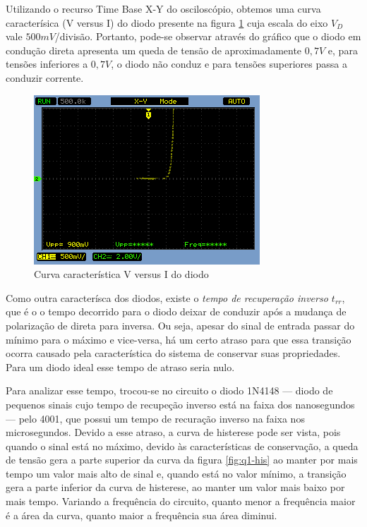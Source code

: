 \documentclass[a4paper]{article} %
\begin{document}
Utilizando o recurso Time Base X-Y do osciloscópio, obtemos uma curva caracterísica (V versus I) do diodo presente na figura \ref{fig:q1-curva2} cuja escala do eixo $V_D$ vale $500mV$/divisão. Portanto, pode-se observar através do gráfico que o diodo em condução direta apresenta um queda de tensão de aproximadamente $0,7V$ e, para tensões inferiores a $0,7V$, o diodo não conduz e para tensões superiores passa a conduzir corrente.    
\begin{figure}[h]
\begin{centering}
\includegraphics[scale=0.5]{Imagens/3.1/NewFile0} \caption{Curva característica V versus I do diodo  \label{fig:q1-curva2}}
\par\end{centering}
\end{figure}


Como outra caracterísca dos diodos, existe o \textit{tempo de recuperação inverso $t_{rr}$}, que é o o tempo decorrido para o diodo deixar de conduzir após a mudança de polarização de direta para inversa. Ou seja, apesar do sinal de entrada passar do mínimo para o máximo e vice-versa, há um certo atraso para que essa transição ocorra causado pela característica do sistema de conservar suas propriedades. Para um diodo ideal esse tempo de atraso seria nulo.

Para analizar esse tempo, trocou-se no circuito o diodo 1N4148 --- diodo de pequenos sinais cujo tempo de recupeção inverso está na faixa dos nanosegundos ---  pelo 4001, que possui um tempo de recuração inverso na faixa nos microsegundos. Devido a esse atraso, a curva de histerese pode ser vista, pois quando o sinal está no máximo, devido às características de conservação, a queda de tensão gera a parte superior da curva da figura \ref{fig:q1-his} ao manter por mais tempo um valor mais alto de sinal e, quando está no valor mínimo, a transição gera a parte inferior da curva de histerese, ao manter um valor mais baixo por mais tempo. Variando a frequência do circuito, quanto menor a frequência maior é a área da curva, quanto maior a frequência sua área diminui.
\end{document}
